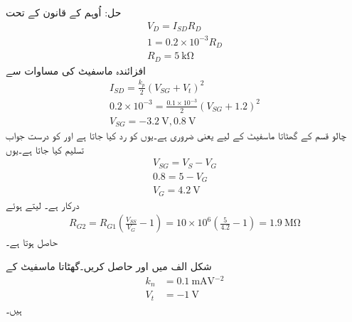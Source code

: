 حل:	اُوہم کے قانون کے تحت
\begin{align*}
V_D=I_{SD}R_D\\
1=0.2 \times 10^{-3} R_D\\
R_D=\SI{5}{\kilo \ohm}
\end{align*}
افزائندہ ماسفیٹ کی مساوات سے
\begin{align*}
I_{SD}=\frac{k_p}{2} \left(V_{SG}+V_t \right )^{2} \\
0.2 \times 10^{-3}=\frac{0.1 \times 10^{-3}}{2} \left(V_{SG}+1.2 \right )^{2}\\
V_{SG}=\SI{-3.2}{\volt}, \SI{0.8}{\volt}
\end{align*}
چالو   قسم کے گھٹاتا ماسفیٹ کے لیے  یعنی  ضروری ہے۔یوں   کو رد کیا جاتا ہے اور    کو درست جواب تسلیم کیا جاتا ہے۔یوں
\begin{align*}
V_{SG}=V_S-V_G\\
0.8=5-V_G\\
V_G=\SI{4.2}{\volt}
\end{align*}
درکار ہے۔  لیتے ہوئے
\begin{align*}
R_{G2}=R_{G1} \left(\frac{V_{SS}}{V_G}-1 \right )=10 \times 10^{6} \left(\frac{5}{4.2}-1 \right)=\SI{1.9}{\mega \ohm}
\end{align*}
حاصل ہوتا ہے۔


شکل  الف میں  اور  حاصل کریں۔گھٹاتا ماسفیٹ کے
\begin{align*}
k_n&=\SI{0.1}{\milli \ampere \volt^{-2}}\\
V_t&=\SI{-1}{\volt}
\end{align*}
ہیں۔

